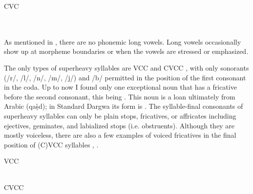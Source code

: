 \begin{exe}
\TabPositions{11em}
	\ex	CVC	\label{ex:syllable CVC phon} \\
		 	\tab 	{} 	\\
		 	\tab 	{} 	\\
		 	\tab 	{} 	
\end{exe}

As mentioned in , there are no phonemic long vowels. Long vowels occasionally show up at morpheme boundaries or when the vowels are stressed or emphasized.

The only types of superheavy syllables are VCC  and CVCC , with only sonorants (/r/, /l/, /n/, /m/, /j/) and /b/ permitted in the position of the first consonant in the coda. Up to now I found only one exceptional noun that has a fricative before the second consonant, this being  . This noun is a loan ultimately from Arabic (qaṣ̊d); in Standard Dargwa its form is . The syllable-final consonants of superheavy syllables can only be plain stops, fricatives, or affricates including ejectives, geminates, and labialized stops (i.e. obstruents). Although they are mostly voiceless, there are also a few examples of voiced fricatives in the final position of (C)VCC syllables , .
%
\begin{exe}
\TabPositions{13em}
	\ex	VCC	\label{ex:syllable VCC phon}\\
		 	\tab 		{} 	\\
		 	\tab 		{} 	
\end{exe}

\begin{exe}
\TabPositions{13em}
	\ex	CVCC	\label{ex:syllable CVCC phon}\\
		 	\tab 		{} 	\\
		  	\tab 		{} 	\\
		 	\tab 		{} 	\\
		 	\tab 		{} 	\\
		 	\tab 		{}  	\\
		 	\tab 		{} 	\\
		 	
\end{exe}
 
